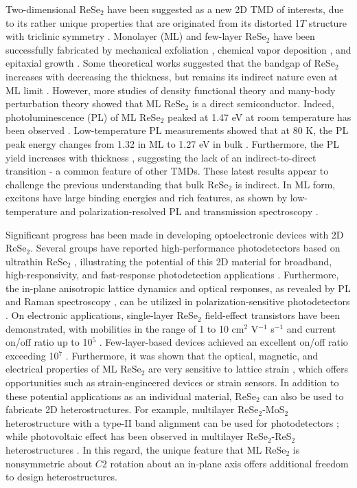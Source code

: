 \documentclass{osa-article}
\begin{document}
Two-dimensional ReSe$_2$ have been suggested as a new 2D TMD of interests, due to its rather unique properties that are originated from its distorted 1$T$ structure with triclinic symmetry  \cite{jpcm94411}. Monolayer (ML) and few-layer ReSe$_2$ have been successfully fabricated by mechanical exfoliation \cite{nanoscale67226,acsnano811154,nl151660,nr83651,b96165418,nl173202}, chemical vapor deposition \cite{am288296}, and epitaxial growth \cite{nr102732}. Some theoretical works suggested that the bandgap of ReSe$_2$ increases with decreasing the thickness, but remains its indirect nature even at ML limit \cite{nanoscale67226,acsnano811154}. However, more studies of density functional theory \cite{nl151660} and many-body perturbation theory \cite{b92115438} showed that ML ReSe$_2$ is a direct semiconductor. Indeed, photoluminescence (PL) of ML ReSe$_2$ peaked at 1.47 eV at room temperature has been observed \cite{nl151660}. Low-temperature PL measurements showed that at 80 K, the PL peak energy changes from 1.32 in ML to 1.27 eV in bulk \cite{nr83651}. Furthermore, the PL yield increases with thickness  \cite{nr83651}, suggesting the lack of an indirect-to-direct transition - a common feature of other TMDs. These latest results appear to challenge the previous understanding that bulk ReSe$_2$ is indirect. In ML form, excitons have large binding energies and rich features, as shown by low-temperature and polarization-resolved PL and transmission spectroscopy \cite{nl173202}.

Significant progress has been made in developing optoelectronic devices with 2D ReSe$_2$. Several groups have reported high-performance photodetectors based on ultrathin ReSe$_2$ \cite{am288296,nr102732}, illustrating the potential of this 2D material for broadband, high-responsivity, and fast-response photodetection applications \cite{am286711}. Furthermore, the in-plane anisotropic lattice dynamics and optical responses, as revealed by PL \cite{nr83651,nl173202} and Raman spectroscopy \cite{acsnano811154,acsnano102752}, can be utilized in polarization-sensitive photodetectors \cite{acsnano108067}. On electronic applications, single-layer ReSe$_2$ field-effect transistors have been demonstrated, with mobilities in the range of 1 to 10 cm$^2$ V$^{-1}$ s$^{-1}$  \cite{nr102732,nanoscale67226} and current on/off ratio up to 10$^5$ \cite{nr102732}. Few-layer-based devices achieved an excellent on/off ratio exceeding 10$^7$ \cite{acsnano108067}. Furthermore, it was shown that the optical, magnetic, and electrical properties of ML ReSe$_2$ are very sensitive to lattice strain \cite{nl151660}, which offers opportunities such as strain-engineered devices or strain sensors. In addition to these potential applications as an individual material, ReSe$_2$ can also be used to fabricate 2D heterostructures. For example, multilayer ReSe$_2$-MoS$_2$ heterostructure with a type-II band alignment can be used for photodetectors \cite{nr9507}; while photovoltaic effect has been observed in multilayer ReSe$_2$-ReS$_2$ heterostructures \cite{aplm5076101}. In this regard, the unique feature that ML ReSe$_2$ is nonsymmetric about $C$2 rotation about an in-plane axis  \cite{nl161381} offers additional freedom to design heterostructures.
\end{document}
